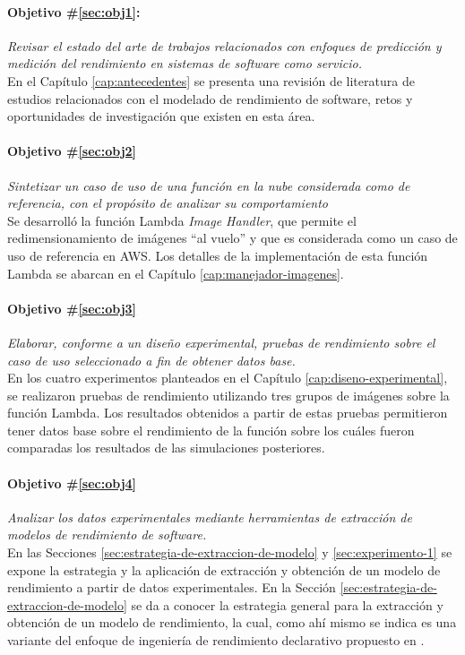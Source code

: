 \paragraph{Objetivo \#\ref{sec:obj1}:} \emph{Revisar el estado del arte de trabajos relacionados con enfoques de predicción y medición del rendimiento en sistemas de software como servicio.}\\
En el Capítulo \ref{cap:antecedentes} se presenta una revisión de literatura de estudios relacionados con el modelado de rendimiento de software, retos y oportunidades de investigación que existen en esta área.

\paragraph{Objetivo \#\ref{sec:obj2}} \emph{Sintetizar un caso de uso de una función en la nube considerada como de referencia, con el propósito de analizar su comportamiento}\\
Se desarrolló la función Lambda \emph{Image Handler}, que permite el redimensionamiento de imágenes ``al vuelo'' y que es considerada como un caso de uso de referencia en AWS. Los detalles de la implementación de esta función Lambda se abarcan en el Capítulo \ref{cap:manejador-imagenes}.
 
\paragraph{Objetivo \#\ref{sec:obj3}} \emph{Elaborar, conforme a un diseño experimental, pruebas de rendimiento sobre el caso de uso seleccionado a fin de obtener datos base.}\\
En los cuatro experimentos planteados en el Capítulo \ref{cap:diseno-experimental}, se realizaron pruebas de rendimiento utilizando tres grupos de imágenes sobre la función Lambda. Los resultados obtenidos a partir de estas pruebas permitieron tener datos base sobre el rendimiento de la función sobre los cuáles fueron comparadas los resultados de las simulaciones posteriores.

\paragraph{Objetivo \#\ref{sec:obj4}} \emph{Analizar los datos experimentales mediante herramientas de extracción de modelos de rendimiento de software.}\\
En las Secciones \ref{sec:estrategia-de-extraccion-de-modelo} y \ref{sec:experimento-1} se expone la estrategia y la aplicación de extracción y obtención de un modelo de rendimiento a partir de datos experimentales. En la Sección \ref{sec:estrategia-de-extraccion-de-modelo} se da a conocer la estrategia general para la extracción y obtención de un modelo de rendimiento, la cual, como ahí mismo se indica es una variante del enfoque de ingeniería de rendimiento declarativo propuesto en \cite{Walter:2018:TDP:3185768.3185777}.

